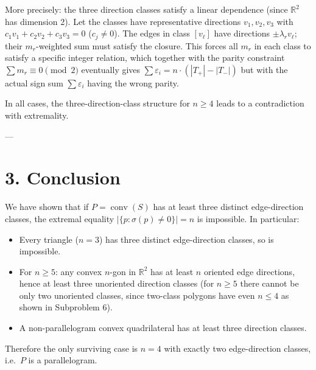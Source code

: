 More precisely: the three direction classes satisfy a linear dependence (since \(\mathbb{R}^2\) has dimension 2).  Let the classes have representative directions \(v_1,v_2,v_3\) with \(c_1v_1+c_2v_2+c_3v_3=0\) (\(c_j\ne 0\)).  The edges in class \([v_\ell]\) have directions \(\pm\lambda_r v_\ell\); their \(m_r\)-weighted sum must satisfy the closure.  This forces all \(m_r\) in each class to satisfy a specific integer relation, which together with the parity constraint \(\sum m_r\equiv 0\pmod 2\) eventually gives \(\sum \varepsilon_i = n\cdot(|T_+|-|T_-|)\) but with the actual sign sum \(\sum \varepsilon_i\) having the wrong parity.

In all cases, the three-direction-class structure for \(n\ge 4\) leads to a contradiction with extremality.

---

\section*{3. Conclusion}

We have shown that if \(P=\operatorname{conv}(S)\) has at least three distinct edge-direction classes, the extremal equality \(|\{p:\sigma(p)\ne 0\}|=n\) is impossible.  In particular:

\begin{itemize}
  \item Every triangle (\(n=3\)) has three distinct edge-direction classes, so is impossible.
  \item For \(n\ge 5\): any convex \(n\)-gon in \(\mathbb{R}^2\) has at least \(n\) oriented edge directions, hence at least three unoriented direction classes (for \(n\ge 5\) there cannot be only two unoriented classes, since two-class polygons have even \(n\le 4\) as shown in Subproblem 6).
  \item A non-parallelogram convex quadrilateral has at least three direction classes.
\end{itemize}

Therefore the only surviving case is \(n=4\) with exactly two edge-direction classes, i.e.\ \(P\) is a parallelogram.
